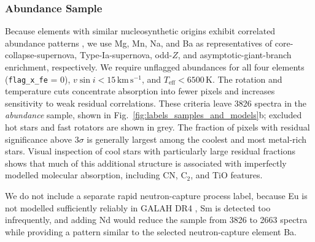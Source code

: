 \documentclass[twocolumn,apj,numberedappendix,appendixfloats]{openjournal}
\begin{document}
\subsubsection{Abundance Sample}
\label{sec:sample_abundance}

Because elements with similar nucleosynthetic origins exhibit correlated abundance patterns \citep[e.g.][]{Kobayashi2020}, we use Mg, Mn, Na, and Ba as representatives of core-collapse-supernova, Type-Ia-supernova, odd-$Z$, and asymptotic-giant-branch enrichment, respectively. We require unflagged abundances for all four elements (\texttt{flag\_x\_fe} = 0), $v\sin i<15\,\mathrm{km\,s^{-1}}$, and $T_\mathrm{eff}<6500\,\mathrm{K}$. The rotation and temperature cuts concentrate absorption into fewer pixels and increases sensitivity to weak residual correlations. These criteria leave 3826 spectra in the \textit{abundance} sample, shown in Fig.~\ref{fig:labels_samples_and_models}b; excluded hot stars and fast rotators are shown in grey. The fraction of pixels with residual significance above $3\sigma$ is generally largest among the coolest and most metal-rich stars. Visual inspection of cool stars with particularly large residual fractions shows that much of this additional structure is associated with imperfectly modelled molecular absorption, including CN, $\mathrm{C}_2$, and TiO features.

We do not include a separate rapid neutron-capture process label, because Eu is not modelled sufficiently reliably in GALAH DR4 \citep{Kane2026}, Sm is detected too infrequently, and adding Nd would reduce the sample from 3826 to 2663 spectra while providing a pattern similar to the selected neutron-capture element Ba.


\end{document}
